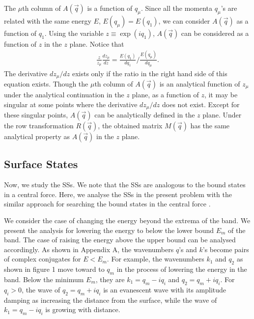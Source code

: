 \documentclass[aps,pra,amsmath,twocolumn,showpacs,bibnotes,10pt]{revtex4-1}
\begin{document}
The $\mu$th column of $A(\vec q)$ is a function of $q_{\mu}$. Since all the momenta $q_{\mu}$'s are related with the same energy $E$, $E(q_{\mu}) = E(q_1)$, we can consider $A(\vec q)$ as a function of $q_1$. Using the variable $z \equiv \exp(iq_1)$, $A(\vec q)$ can be considered as a function of $z$ in the $z$ plane. Notice that
\begin{eqnarray}
\frac{z}{z_{\mu}}\frac{dz_{\mu}}{dz}= \frac{E(q_1)}{dq_1}/\frac{E(q_{\mu})}{dq_{\mu}}. \nonumber
\end{eqnarray}
The derivative $dz_{\mu}/dz$ exists only if the ratio in the right hand side of this equation exists. Though the $\mu$th column of $A(\vec q)$ is an analytical function of $z_{\mu}$ under the analytical continuation in the $z$ plane, as a function of $z$, it may be singular at some points where the derivative $dz_{\mu}/dz$ does not exist. Except for these singular points, $A(\vec q)$ can be analytically defined in the $z$ plane. Under the row transformation $R(\vec q)$, the obtained matrix $M(\vec q)$ has the same analytical property as $A(\vec q)$ in the $z$ plane. 

\subsection{Surface States} 

Now, we study the SSs. We note that the SSs are analogous to the bound states in a central force. Here, we analyse the SSs in the present problem with the similar approach for searching the bound states in the central force \cite{Levinson,Newton}.

We consider the case of changing the energy beyond the extrema of the band. We present the analysis for lowering the energy to below the lower bound $E_m$ of the band. The case of raising the energy above the upper bound can be analysed accordingly. As shown in Appendix A, the wavenumbers $q$'s and $k$'s become pairs of complex conjugates for $E < E_m$. For example, the wavenumbers $k_1$ and $q_2$ as shown in figure 1 move toward to $q_m$ in the process of lowering the energy in the band. Below the minimum $E_m$, they are $k_1 = q_m-iq_i$ and $q_2 = q_m+iq_i$. For $q_i > 0$, the wave of $q_2=q_m+iq_i$ is an evanescent wave with its amplitude damping as increasing the distance from the surface, while the wave of $k_1=q_m-iq_i$ is growing with distance. 
\end{document}
